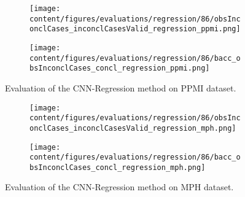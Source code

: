 \begin{figure}[t]
  \begin{subfigure}{0.9\textwidth}
    \centering
    \texttt{[image: content/figures/evaluations/regression/86/obsInconclCases\_inconclCasesValid\_regression\_ppmi.png]}
    \label{fig:obsInconclCases_inconclCasesValid_regression_ppmi}
  \end{subfigure}
  \hfill
  \begin{subfigure}{0.9\textwidth}
    \centering
    \texttt{[image: content/figures/evaluations/regression/86/bacc\_obsInconclCases\_concl\_regression\_ppmi.png]}
    \label{fig:bacc_obsInconclCases_concl_regression_ppmi}
  \end{subfigure}
  \caption{Evaluation of the CNN-Regression method on PPMI dataset.}
\end{figure}





\begin{figure}[t]
  \begin{subfigure}{0.9\textwidth}
    \centering
    \texttt{[image: content/figures/evaluations/regression/86/obsInconclCases\_inconclCasesValid\_regression\_mph.png]}
    \label{fig:obsInconclCases_inconclCasesValid_regression_mph}
  \end{subfigure}
  \hfill
  \begin{subfigure}{0.9\textwidth}
    \centering
    \texttt{[image: content/figures/evaluations/regression/86/bacc\_obsInconclCases\_concl\_regression\_mph.png]}
    \label{fig:bacc_obsInconclCases_concl_regression_mph}
  \end{subfigure}
  \caption{Evaluation of the CNN-Regression method on MPH dataset.}
\end{figure}


